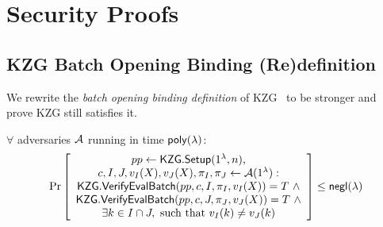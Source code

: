 \section{Security Proofs}

\subsection{KZG Batch Opening Binding (Re)definition}
\label{s:kzg-batch-def}

We rewrite the \textit{batch opening binding definition} of KZG~\cite[Sec. 3.4, pg. 9]{KZG10a} to be stronger and prove KZG still satisfies it.

\begin{definition}
    \label{def:kzg:batch-opening-binding}
    $\forall$ adversaries $\mathcal{A}$ running in time $\mathsf{poly}(\lambda)$:
    \begin{align}
    \Pr \left[ \begin{array}{c}
    pp \leftarrow \mathsf{KZG.Setup}(1^\lambda, n), \\
    c, I, J, v_I(X), v_J(X), \pi_I, \pi_J \leftarrow \mathcal{A}(1^\lambda) : \\
    \mathsf{KZG.VerifyEvalBatch}(pp, c, I, \pi_I, v_I(X)) = T\ \wedge \\
    \mathsf{KZG.VerifyEvalBatch}(pp, c, J, \pi_J, v_J(X)) = T\ \wedge \\
    \exists k \in I\cap J,\ \text{such that}\ v_I(k) \ne v_J(k)
    \end{array} \right] \le \mathsf{negl}(\lambda)
    \end{align}
\end{definition}

